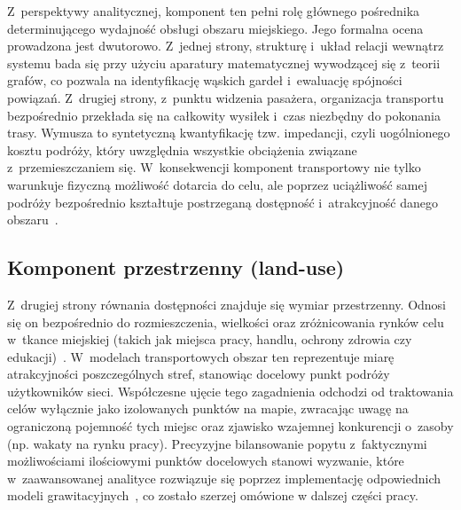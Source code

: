 \documentclass{pracamgr}
\begin{document}
Z~perspektywy analitycznej, komponent ten pełni rolę głównego pośrednika determinującego wydajność obsługi obszaru miejskiego. Jego formalna ocena prowadzona jest dwutorowo. Z~jednej strony, strukturę i~układ relacji wewnątrz systemu bada się przy użyciu aparatury matematycznej wywodzącej się z~teorii grafów, co pozwala na identyfikację wąskich gardeł i~ewaluację spójności powiązań. Z~drugiej strony, z~punktu widzenia pasażera, organizacja transportu bezpośrednio przekłada się na całkowity wysiłek i~czas niezbędny do pokonania trasy. Wymusza to syntetyczną kwantyfikację tzw. impedancji, czyli uogólnionego kosztu podróży, który uwzględnia wszystkie obciążenia związane z~przemieszczaniem się. W~konsekwencji komponent transportowy nie tylko warunkuje fizyczną możliwość dotarcia do celu, ale poprzez uciążliwość samej podróży bezpośrednio kształtuje postrzeganą dostępność i~atrakcyjność danego obszaru~\cite{capetown, LUO2019102505}.

\subsection{Komponent przestrzenny (land-use)}\label{subsection:komponent_przestrzenny}
Z~drugiej strony równania dostępności znajduje się wymiar przestrzenny. Odnosi się on bezpośrednio do rozmieszczenia, wielkości oraz zróżnicowania rynków celu w~tkance miejskiej (takich jak miejsca pracy, handlu, ochrony zdrowia czy edukacji)~\cite{elavating, capetown, Kozlak_Aleksandra_Znaczenie_2010}. W~modelach transportowych obszar ten reprezentuje miarę atrakcyjności poszczególnych stref, stanowiąc docelowy punkt podróży użytkowników sieci. Współczesne ujęcie tego zagadnienia odchodzi od traktowania celów wyłącznie jako izolowanych punktów na mapie, zwracając uwagę na ograniczoną pojemność tych miejsc oraz zjawisko wzajemnej konkurencji o~zasoby (np. wakaty na rynku pracy). Precyzyjne bilansowanie popytu z~faktycznymi możliwościami ilościowymi punktów docelowych stanowi wyzwanie, które w~zaawansowanej analityce rozwiązuje się poprzez implementację odpowiednich modeli grawitacyjnych~\cite{gravity2, mrt}, co zostało szerzej omówione w dalszej części pracy.
\end{document}
